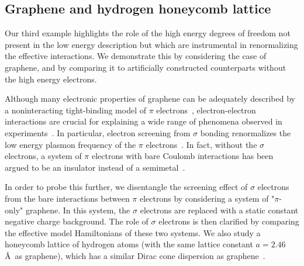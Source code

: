 \subsection{Graphene and hydrogen honeycomb lattice}
\label{subsection:graphene}
Our third example highlights the role of the high energy 
degrees of freedom not present in the low energy description 
but which are instrumental in renormalizing the effective interactions. 
We demonstrate this by considering the case of graphene, and by 
comparing it to artificially constructed counterparts without the high energy electrons. 

Although many electronic properties of graphene can be adequately 
described by a noninteracting tight-binding model of $\pi$ electrons~\cite{Castro2009}, 
electron-electron interactions are crucial for explaining 
a wide range of phenomena observed in experiments~\cite{Kotov2012}. 
In particular, electron screening from $\sigma$ bonding renormalizes 
the low energy plasmon frequency of the $\pi$ electrons~\cite{Zheng2016}. In fact, 
without the $\sigma$ electrons, a system of $\pi$ electrons with bare Coulomb interactions has been argued to be an 
insulator instead of a semimetal~\cite{DrutPRL2009, DrutPRB2009,  Smith2014, Zheng2016}. 

In order to probe this further, we disentangle the screening effect of $\sigma$ electrons from the bare interactions 
between $\pi$ electrons by considering a system of "$\pi$-only" graphene. In this system, the 
$\sigma$ electrons are replaced with a static constant negative charge background. 
The role of $\sigma$ electrons is then clarified by comparing the effective model Hamiltonians of these two systems. 
We also study a honeycomb lattice of hydrogen atoms (with the same lattice constant $a=2.46$\AA~as graphene), 
which has a similar Dirac cone dispersion as graphene~\cite{Zheng2016}. 


